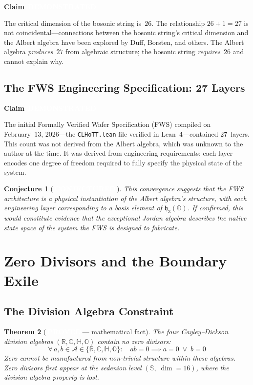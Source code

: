 \documentclass[11pt,letterpaper]{article}
\newcommand{\proved}{\texorpdfstring{\colorbox{proved}{\textcolor{white}{\scriptsize\textbf{\,PROVED\,}}}}{ [PROVED]}}
\newcommand{\demonstrated}{\texorpdfstring{\colorbox{demonstrated}{\textcolor{white}{\scriptsize\textbf{\,DEMONSTRATED\,}}}}{ [DEMONSTRATED]}}
\newcommand{\conjectured}{\texorpdfstring{\colorbox{conjectured}{\textcolor{white}{\scriptsize\textbf{\,CONJECTURED\,}}}}{ [CONJECTURED]}}
\newtheorem{theorem}{Theorem}[section]
\newtheorem{conjecture}[theorem]{Conjecture}
\newenvironment{claim}[1]{%
  \par\medskip\noindent\textbf{Claim} #1\quad\itshape
}{%
  \par\medskip
}
\newcommand{\R}{\mathbb{R}}
\newcommand{\C}{\mathbb{C}}
\newcommand{\HH}{\mathbb{H}}
\newcommand{\OO}{\mathbb{O}}
\newcommand{\SED}{\mathbb{S}}
\newcommand{\hthreeO}{\mathfrak{h}_3(\OO)}
\begin{document}
\begin{claim}{\demonstrated}
The critical dimension of the bosonic string is~$26$. The relationship $26 + 1 = 27$ is not coincidental---connections between the bosonic string's critical dimension and the Albert algebra have been explored by Duff, Borsten, and others. The Albert algebra \emph{produces}~$27$ from algebraic structure; the bosonic string \emph{requires}~$26$ and cannot explain why.
\end{claim}

\subsection{The FWS Engineering Specification: 27 Layers}

\begin{claim}{\demonstrated}
The initial Formally Verified Wafer Specification (FWS) compiled on February~13, 2026---the \texttt{CLHoTT.lean} file verified in Lean~4---contained 27~layers. This count was not derived from the Albert algebra, which was unknown to the author at the time. It was derived from engineering requirements: each layer encodes one degree of freedom required to fully specify the physical state of the system.
\end{claim}

\begin{conjecture}[\conjectured]\label{conj:fws-albert}
This convergence suggests that the FWS architecture is a physical instantiation of the Albert algebra's structure, with each engineering layer corresponding to a basis element of $\hthreeO$. If confirmed, this would constitute evidence that the exceptional Jordan algebra describes the native state space of the system the FWS is designed to fabricate.
\end{conjecture}


\section{Zero Divisors and the Boundary Exile}

\subsection{The Division Algebra Constraint}

\begin{theorem}[\proved --- mathematical fact]\label{thm:nodivisors}
The four Cayley--Dickson division algebras $(\R, \C, \HH, \OO)$ contain no zero divisors:
\[
  \forall\, a, b \in \mathcal{A} \in \{\R, \C, \HH, \OO\}:\quad ab = 0 \implies a = 0 \;\lor\; b = 0
\]
Zero cannot be manufactured from non-trivial structure within these algebras. Zero divisors first appear at the sedenion level $(\SED,\; \dim = 16)$, where the division algebra property is lost.
\end{theorem}
\end{document}
